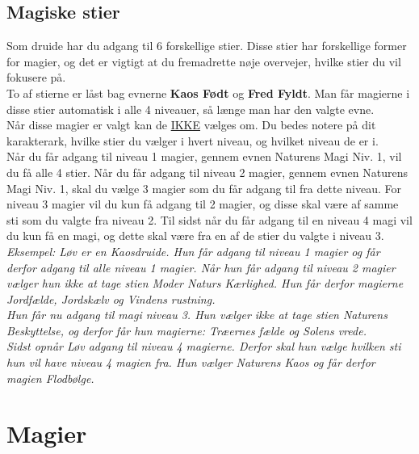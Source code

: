 \section{Magiske stier}
Som druide har du adgang til 6 forskellige stier. Disse stier har forskellige former for magier, og det er vigtigt at du fremadrette nøje overvejer, hvilke stier du vil fokusere på.\\
To af stierne er låst bag evnerne \textbf{Kaos Født} og \textbf{Fred Fyldt}. Man får magierne i disse stier automatisk i alle 4 niveauer, så længe man har den valgte evne.\\
Når disse magier er valgt kan de \underline{IKKE} vælges om. Du bedes notere på dit karakterark, hvilke stier du vælger i hvert niveau, og hvilket niveau de er i.\\
Når du får adgang til niveau 1 magier, gennem evnen Naturens Magi Niv. 1, vil du få alle 4 stier. Når du får adgang til niveau 2 magier, gennem evnen Naturens Magi Niv. 1, skal du vælge 3 magier som du får adgang til fra dette niveau. For niveau 3 magier vil du kun få adgang til 2 magier, og disse skal være af samme sti som du valgte fra niveau 2. Til sidst når du får adgang til en niveau 4 magi vil du kun få en magi, og dette skal være fra en af de stier du valgte i niveau 3. \\
\textit{Eksempel: Løv er en Kaosdruide. Hun får adgang til niveau 1 magier og får derfor adgang til alle niveau 1 magier. Når hun får adgang til niveau 2 magier vælger hun ikke at tage stien Moder Naturs Kærlighed. Hun får derfor magierne Jordfælde, Jordskælv og Vindens rustning.\\
Hun får nu adgang til magi niveau 3. Hun vælger ikke at tage stien Naturens Beskyttelse, og derfor får hun magierne: Træernes fælde og Solens vrede.\\
Sidst opnår Løv adgang til niveau 4 magierne. Derfor skal hun vælge hvilken sti hun vil have niveau 4 magien fra. Hun vælger Naturens Kaos og får derfor magien Flodbølge.\\}

\chapter{Magier}

